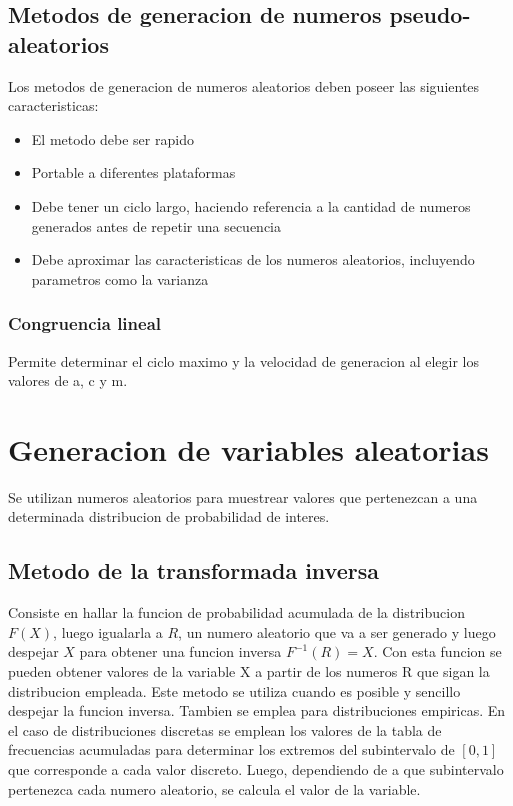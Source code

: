 \documentclass[a4paper]{article}
\begin{document}
\subsection*{Metodos de generacion de numeros pseudo-aleatorios}
Los metodos de generacion de numeros aleatorios deben poseer las siguientes caracteristicas:
\begin{itemize}
    \item El metodo debe ser rapido
    \item Portable a diferentes plataformas
    \item Debe tener un ciclo largo, haciendo referencia a la cantidad de numeros generados antes de repetir una 
    secuencia
    \item Debe aproximar las caracteristicas de los numeros aleatorios, incluyendo parametros como la varianza
\end{itemize}

\subsubsection*{Congruencia lineal} %
Permite determinar el ciclo maximo y la velocidad de generacion al elegir los valores de a, c y m.

\section{Generacion de variables aleatorias}
Se utilizan numeros aleatorios para muestrear valores que pertenezcan a una determinada distribucion de
probabilidad de interes.

\subsection*{Metodo de la transformada inversa}
Consiste en hallar la funcion de probabilidad acumulada de la distribucion $F(X)$, luego igualarla a $R$,
un numero aleatorio que va a ser generado y luego despejar $X$ para obtener una funcion inversa $F^{-1}(R) = X$.
Con esta funcion se pueden obtener valores de la variable X a partir de los numeros R que sigan la distribucion 
empleada. 
Este metodo se utiliza cuando es posible y sencillo despejar la funcion inversa. Tambien se emplea para distribuciones
empiricas.
En el caso de distribuciones discretas se emplean los valores de la tabla de frecuencias acumuladas para determinar 
los extremos del subintervalo de $[0,1]$ que corresponde a cada valor discreto. Luego, dependiendo de a que subintervalo
pertenezca cada numero aleatorio, se calcula el valor de la variable.
\end{document}
